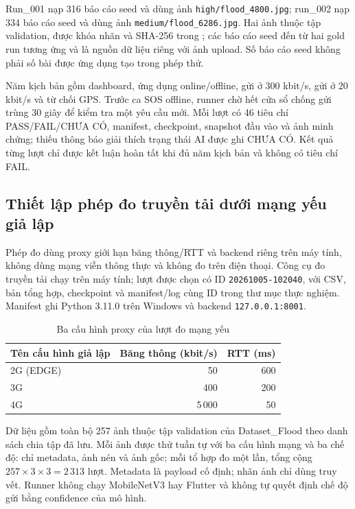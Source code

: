 Run\_001 nạp 316 báo cáo seed và dùng ảnh \texttt{high/flood\_4800.jpg}; run\_002 nạp 334 báo cáo seed và dùng ảnh \texttt{medium/flood\_6286.jpg}. Hai ảnh thuộc tập validation, được khóa nhãn và SHA-256 trong ; các báo cáo seed đến từ hai gold run tương ứng và là nguồn dữ liệu riêng với ảnh upload. Số báo cáo seed không phải số bài được ứng dụng tạo trong phép thử.

Năm kịch bản gồm dashboard, ứng dụng online/offline, gửi ở 300 kbit/s, gửi ở 20 kbit/s và từ chối GPS. Trước ca SOS offline, runner chờ hết cửa sổ chống gửi trùng 30 giây để kiểm tra một yêu cầu mới. Mỗi lượt có 46 tiêu chí PASS/FAIL/CHƯA CÓ, manifest, checkpoint, snapshot đầu vào và ảnh minh chứng; thiếu thông báo giải thích trạng thái AI được ghi CHƯA CÓ. Kết quả từng lượt chỉ được kết luận hoàn tất khi đủ năm kịch bản và không có tiêu chí FAIL.

\subsection{Thiết lập phép đo truyền tải dưới mạng yếu giả lập}\label{sec:weak-network-setup}
Phép đo dùng proxy giới hạn băng thông/RTT và backend riêng trên máy tính, không dùng mạng viễn thông thực và không đo trên điện thoại. Công cụ đo truyền tải chạy trên máy tính; lượt được chọn có ID \texttt{20261005-102040}, với CSV, bản tổng hợp, checkpoint và manifest/log cùng ID trong thư mục thực nghiệm. Manifest ghi Python 3.11.0 trên Windows và backend \texttt{127.0.0.1:8001}.

\begin{table}[H]\centering
\caption{Ba cấu hình proxy của lượt đo mạng yếu}
\label{tab:weak-network-profiles}
\begin{tabular}{lrr}
\toprule Tên cấu hình giả lập & Băng thông (kbit/s) & RTT (ms) \\
\midrule
2G (EDGE) & 50 & 600 \\
3G & 400 & 200 \\
4G & 5\,000 & 50 \\
\bottomrule
\end{tabular}
\end{table}
Dữ liệu gồm toàn bộ 257 ảnh thuộc tập validation của Dataset\_Flood theo danh sách chia tập đã lưu. Mỗi ảnh được thử tuần tự với ba cấu hình mạng và ba chế độ: chỉ metadata, ảnh nén và ảnh gốc; mỗi tổ hợp đo một lần, tổng cộng $257\times3\times3=2\,313$ lượt. Metadata là payload cố định; nhãn ảnh chỉ dùng truy vết. Runner không chạy MobileNetV3 hay Flutter và không tự quyết định chế độ gửi bằng confidence của mô hình.

